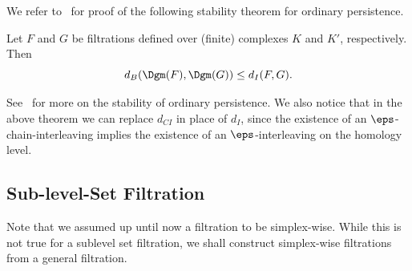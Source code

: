 
We refer to~\cite{ChazalCohenSteinerGlisse2009} for proof of the following 
stability theorem for ordinary persistence.

\begin{theorem}
\label{theorem:persistence-stability}
    Let $F$ and $G$ be filtrations defined over (finite) complexes $K$ and $K'$, respectively. Then 
    $$ d_B( \Dgm(F), \Dgm(G)) \leq d_I(F,G).$$
\end{theorem}

See~\cite{Cohen-SteinerEdelsbrunnerHarer2005, ChazalCohenSteinerGlisse2009} for more on the stability of ordinary persistence. We also notice that in the above theorem we can replace $d_{CI}$ in place of $d_I$, since the existence of an $\eps$-chain-interleaving implies the existence of an $\eps$-interleaving on the homology level. 


\subsection{Sub-level-Set Filtration}\label{sec:Sub-level-Set-Filtration}

Note that we assumed up until now a filtration to be simplex-wise. While this is not true for a sublevel set filtration, we shall construct simplex-wise filtrations from a general filtration. 


